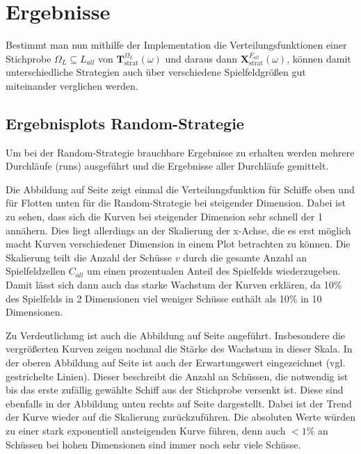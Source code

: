 \documentclass[a4paper,12pt]{llncs}
\numberwithin{equation}{section}
\DeclareMathOperator{\strat}{strat}
\begin{document}


\section{Ergebnisse}


Bestimmt man nun mithilfe der Implementation die Verteilungsfunktionen einer Stichprobe $\Omega_L \subseteq L_{all}$ von $\mathbf{T}^{\Omega_L}_{\strat}(\omega)$ und daraus dann $\mathbf{X}^{F_{all}}_{\strat}(\omega)$, können damit unterschiedliche Strategien auch über verschiedene Spielfeldgrößen gut miteinander verglichen werden.

\subsection{Ergebnisplots Random-Strategie}

\begin{landscape}
	\label{fig:random1}
	
\end{landscape}

\begin{landscape}
	\label{fig:random2}
	
\end{landscape}

Um bei der Random-Strategie brauchbare Ergebnisse zu erhalten werden mehrere Durchläufe (runs) ausgeführt und die Ergebnisse aller Durchläufe gemittelt.

Die Abbildung auf Seite \pageref{fig:random1} zeigt einmal die Verteilungsfunktion für Schiffe oben und für Flotten unten für die Random-Strategie bei steigender Dimension. Dabei ist zu sehen, dass sich die Kurven bei steigender Dimension sehr schnell der 1 annähern. Dies liegt allerdings an der Skalierung der x-Achse, die es erst möglich macht Kurven verschiedener Dimension in einem Plot betrachten zu können. Die Skalierung teilt die Anzahl der Schüsse $v$ durch die gesamte Anzahl an Spielfeldzellen $C_{all}$ um einen prozentualen Anteil des Spielfelds wiederzugeben. Damit lässt sich dann auch das starke Wachstum der Kurven erklären, da 10\% des Spielfelds in 2 Dimensionen viel weniger Schüsse enthält als 10\% in 10 Dimensionen.

Zu Verdeutlichung ist auch die Abbildung auf Seite \pageref{fig:random2} angeführt. Insbesondere die vergrößerten Kurven zeigen nochmal die Stärke des Wachstum in dieser Skala. In der oberen Abbildung auf Seite \pageref{fig:random1} ist auch der Erwartungswert eingezeichnet (vgl. gestrichelte Linien). Dieser beschreibt die Anzahl an Schüssen, die notwendig ist bis das erste zufällig gewählte Schiff aus der Stichprobe versenkt ist. Diese sind ebenfalls in der Abbildung unten rechts auf Seite \pageref{fig:random2} dargestellt. Dabei ist der Trend der Kurve wieder auf die Skalierung zurückzuführen. Die absoluten Werte würden zu einer stark exponentiell ansteigenden Kurve führen, denn auch $<1\%$ an Schüssen bei hohen Dimensionen sind immer noch sehr viele Schüsse.
\end{document}
